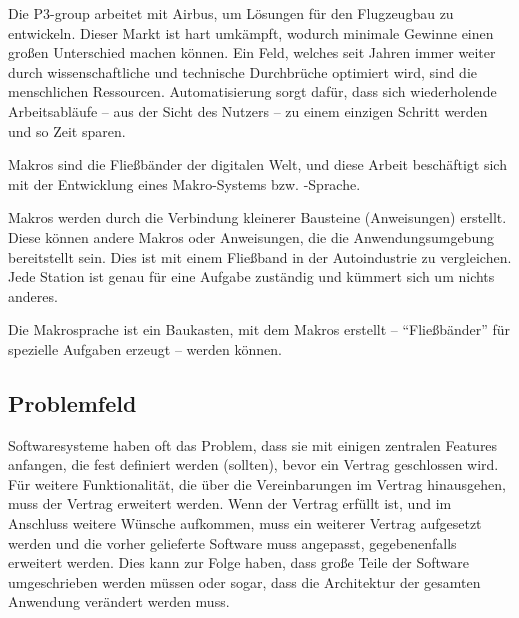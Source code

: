   Die P3-group arbeitet mit Airbus, um Lösungen für den Flugzeugbau zu entwickeln. Dieser Markt ist hart umkämpft, wodurch minimale Gewinne einen großen Unterschied machen können. Ein Feld, welches seit Jahren immer weiter durch wissenschaftliche und technische Durchbrüche optimiert wird, sind die menschlichen Ressourcen. Automatisierung sorgt dafür, dass sich wiederholende Arbeitsabläufe -- aus der Sicht des Nutzers -- zu einem einzigen Schritt werden und so Zeit sparen.

  Makros sind die Fließbänder der digitalen Welt, und diese Arbeit beschäftigt sich mit der Entwicklung eines Makro-Systems bzw. -Sprache.

  Makros werden durch die Verbindung kleinerer Bausteine (Anweisungen) erstellt. Diese können andere Makros oder Anweisungen, die die Anwendungsumgebung bereitstellt sein. Dies ist mit einem Fließband in der Autoindustrie zu vergleichen. Jede Station ist genau für eine Aufgabe zuständig und kümmert sich um nichts anderes.

  Die Makrosprache ist ein Baukasten, mit dem Makros erstellt -- ``Fließbänder'' für spezielle Aufgaben erzeugt -- werden können.

  \subsection{Problemfeld}
  \label{ssec:Problemfeld}
    Softwaresysteme haben oft das Problem, dass sie mit einigen zentralen Features anfangen, die fest definiert werden (sollten), bevor ein Vertrag geschlossen wird. Für weitere Funktionalität, die über die Vereinbarungen im Vertrag hinausgehen, muss der Vertrag erweitert werden. Wenn der Vertrag erfüllt ist, und im Anschluss weitere Wünsche aufkommen, muss ein weiterer Vertrag aufgesetzt werden und die vorher gelieferte Software muss angepasst, gegebenenfalls erweitert werden. Dies kann zur Folge haben, dass große Teile der Software umgeschrieben werden müssen oder sogar, dass die Architektur der gesamten Anwendung verändert werden muss.

